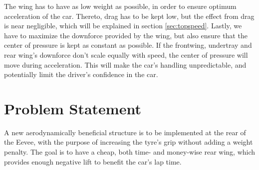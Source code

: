   The wing has to have as low weight as possible, in order to ensure optimum acceleration of the car. Thereto, drag has to be kept low, but the effect from drag is near negligible, which will be explained in section \ref{sec:topspeed}. Lastly, we have to maximize the downforce provided by the wing, but also ensure that the center of pressure is kept as constant as possible. If the frontwing, undertray and rear wing's downforce don't scale equally with speed, the center of pressure will move during acceleration. This will make the car's handling unpredictable, and potentially limit the driver's confidence in the car.

\section{Problem Statement}

  A new aerodynamically beneficial structure is to be implemented at the rear of the Eevee, with the purpose of increasing the tyre's grip without adding a weight penalty. The goal is to have a cheap, both time- and money-wise rear wing, which provides enough negative lift to benefit the car's lap time.
